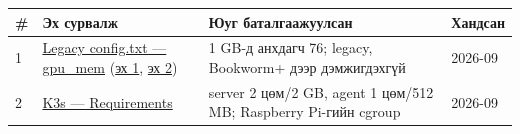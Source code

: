 \begingroup\scriptsize\begin{longtable}[]{@{}llll@{}}
\toprule
\begin{minipage}[b]{0.22\columnwidth}\raggedright
\#\strut
\end{minipage} & \begin{minipage}[b]{0.22\columnwidth}\raggedright
Эх сурвалж\strut
\end{minipage} & \begin{minipage}[b]{0.22\columnwidth}\raggedright
Юуг баталгаажуулсан\strut
\end{minipage} & \begin{minipage}[b]{0.22\columnwidth}\raggedright
Хандсан\strut
\end{minipage}\tabularnewline
\midrule
\endhead
\begin{minipage}[t]{0.22\columnwidth}\raggedright
1\strut
\end{minipage} & \begin{minipage}[t]{0.22\columnwidth}\raggedright
\href{https://www.raspberrypi.com/documentation/computers/legacy_config_txt.html}{Legacy config.\allowbreak{}txt --- gpu\_\allowbreak{}mem} (\href{https://github.com/raspberrypi/documentation/blob/develop/documentation/asciidoc/computers/legacy_config_txt/legacy.adoc}{эх 1}, \href{https://github.com/raspberrypi/documentation/blob/develop/documentation/asciidoc/computers/legacy_config_txt/memory.adoc}{эх 2})\strut
\end{minipage} & \begin{minipage}[t]{0.22\columnwidth}\raggedright
1 GB-д анхдагч 76; legacy, Bookworm+ дээр дэмжигдэхгүй\strut
\end{minipage} & \begin{minipage}[t]{0.22\columnwidth}\raggedright
2026-09\strut
\end{minipage}\tabularnewline
\begin{minipage}[t]{0.22\columnwidth}\raggedright
2\strut
\end{minipage} & \begin{minipage}[t]{0.22\columnwidth}\raggedright
\href{https://docs.k3s.io/installation/requirements}{K3s --- Requirements}\strut
\end{minipage} & \begin{minipage}[t]{0.22\columnwidth}\raggedright
server 2 цөм/2 GB, agent 1 цөм/512 MB; Raspberry Pi-гийн cgroup\strut
\end{minipage} & \begin{minipage}[t]{0.22\columnwidth}\raggedright
2026-09\strut
\end{minipage}\tabularnewline

\end{longtable}
